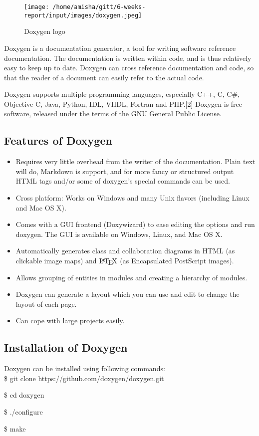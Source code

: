 
\begin{figure}[ht]
\centering \texttt{[image: /home/amisha/gitt/6-weeks-report/input/images/doxygen.jpeg]}
\caption{Doxygen logo}
\end{figure}
\noindent Doxygen is a documentation generator, a tool for writing software reference 
documentation. The documentation is written within code, and is thus 
relatively easy to keep up to date. Doxygen can cross reference 
documentation and code, so that the reader of a document can easily 
refer to the actual code.

Doxygen supports multiple programming languages, especially C++, C, 
C\#, Objective-C, Java, Python, IDL, VHDL, Fortran and PHP.[2] Doxygen
 is free software, released under the terms of the GNU General Public 
License.\\

\subsection{Features of Doxygen}
\begin{itemize}
\item Requires very little overhead from the writer of the documentation. 
Plain text will do, Markdown is support, and for more fancy or structured 
output HTML tags and/or some of doxygen's special commands can be used.
\item Cross platform: Works on Windows and many Unix flavors (including 
Linux and Mac OS X).
\item Comes with a GUI frontend (Doxywizard) to ease editing the options 
and run doxygen. The GUI is available on Windows, Linux, and Mac OS X.
\item Automatically generates class and collaboration diagrams in HTML 
(as clickable image maps) and $\mbox{\LaTeX}$ (as Encapsulated PostScript 
images).
\item Allows grouping of entities in modules and creating a hierarchy 
of modules.
\item Doxygen can generate a layout which you can use and edit to change 
the layout of each page.
\item Can cope with large projects easily.
\end{itemize}
\subsection{Installation of Doxygen}
Doxygen can be installed using following commands:\\

\hspace{4pt} \$ git clone https://github.com/doxygen/doxygen.git

\hspace{4pt} \$ cd doxygen

\hspace{4pt} \$ ./configure

\hspace{4pt} \$ make




